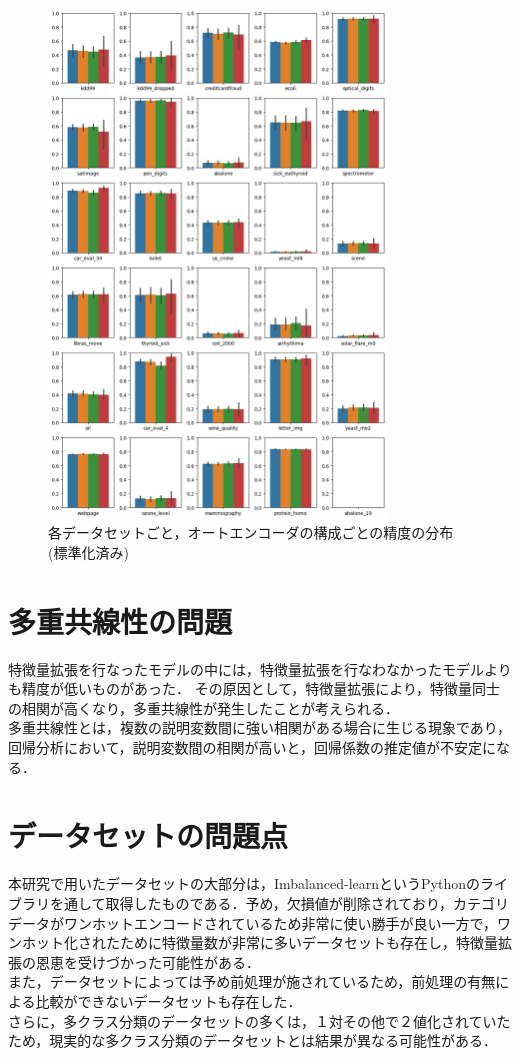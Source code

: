 \begin{figure}
    \centering
    \includegraphics[width=0.8\textwidth]{figures/result-dataset-std.png}
    \caption{各データセットごと，オートエンコーダの構成ごとの精度の分布(標準化済み)}
    \label{fig:compare-dataset-std}
\end{figure}

\section{多重共線性の問題}
特徴量拡張を行なったモデルの中には，特徴量拡張を行なわなかったモデルよりも精度が低いものがあった．
その原因として，特徴量拡張により，特徴量同士の相関が高くなり，多重共線性が発生したことが考えられる．\\
多重共線性とは，複数の説明変数間に強い相関がある場合に生じる現象であり，回帰分析において，説明変数間の相関が高いと，回帰係数の推定値が不安定になる．\\

\section{データセットの問題点}
本研究で用いたデータセットの大部分は，Imbalanced-learnというPythonのライブラリを通して取得したものである．予め，欠損値が削除されており，カテゴリデータがワンホットエンコードされているため非常に使い勝手が良い一方で，ワンホット化されたために特徴量数が非常に多いデータセットも存在し，特徴量拡張の恩恵を受けづかった可能性がある．\\
また，データセットによっては予め前処理が施されているため，前処理の有無による比較ができないデータセットも存在した．\\
さらに，多クラス分類のデータセットの多くは，１対その他で２値化されていたため，現実的な多クラス分類のデータセットとは結果が異なる可能性がある．\\